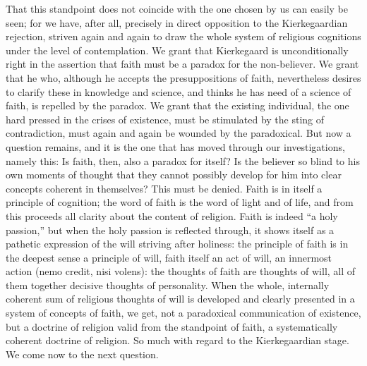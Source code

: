 \documentclass[12pt]{book}
\newcommand{\opage}[1]{\marginnote{\footnotesize\textit{[#1]}}}
\begin{document}
That this standpoint does not coincide with the one chosen by us can
easily be seen; for we have, after all, precisely in direct opposition
to the Kierkegaardian rejection, striven again and again to draw the
whole system of religious cognitions under the level of contemplation.
We grant that Kierkegaard is unconditionally right in the assertion that
faith must be a paradox for the non-believer. We grant that he who,
although he accepts the presuppositions of faith, nevertheless desires
to clarify these in knowledge and science, and thinks he has need of a
science of faith, is repelled by the paradox. We grant that the
existing individual, the one hard pressed in the crises of existence,
must be stimulated by the sting of contradiction, must again and again
be wounded by the paradoxical. But now a question remains, and it is the
one that has moved through our investigations, namely this: Is faith,
then, also a paradox for itself? Is the believer so blind to his own
moments of thought that they cannot possibly develop for him into clear
concepts coherent in themselves? This must be denied. Faith is in
itself a principle of cognition; the word of faith is the word of light
and of life, and from this proceeds all clarity about the content of
religion. Faith is indeed ``a holy passion,'' but when the holy passion
is reflected through, it shows itself as a pathetic expression of the
will striving after holiness: the principle of faith is in the deepest
sense a principle of will, faith itself an act of will, an
\opage{235}\setcounter{footnote}{0}%
innermost action (nemo credit, nisi volens): the thoughts of faith are
thoughts of will, all of them together decisive thoughts of
personality. When the whole, internally coherent sum of religious
thoughts of will is developed and clearly presented in a system of
concepts of faith, we get, not a paradoxical communication of existence,
but a doctrine of religion valid from the standpoint of faith, a
systematically coherent doctrine of religion. So much with regard to the
Kierkegaardian stage. We come now to the next question.
\end{document}
